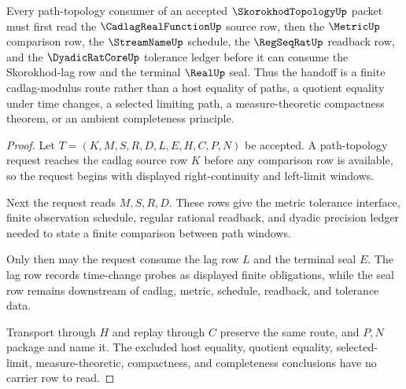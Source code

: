 \begin{theorem}
\label{thm:skorokhod-topology-cadlag-modulus-handoff}
Every path-topology consumer of an accepted $\SkorokhodTopologyUp$ packet must first read the $\CadlagRealFunctionUp$ source row, then the $\MetricUp$ comparison row, the $\StreamNameUp$ schedule, the $\RegSeqRatUp$ readback row, and the $\DyadicRatCoreUp$ tolerance ledger before it can consume the Skorokhod-lag row and the terminal $\RealUp$ seal. Thus the handoff is a finite cadlag-modulus route rather than a host equality of paths, a quotient equality under time changes, a selected limiting path, a measure-theoretic compactness theorem, or an ambient completeness principle.
\end{theorem}
\begin{proof}
Let $T=(K,M,S,R,D,L,E,H,C,P,N)$ be accepted. A path-topology request reaches the cadlag source row $K$ before any comparison row is available, so the request begins with displayed right-continuity and left-limit windows.

Next the request reads $M,S,R,D$. These rows give the metric tolerance interface, finite observation schedule, regular rational readback, and dyadic precision ledger needed to state a finite comparison between path windows.

Only then may the request consume the lag row $L$ and the terminal seal $E$. The lag row records time-change probes as displayed finite obligations, while the seal row remains downstream of cadlag, metric, schedule, readback, and tolerance data.

Transport through $H$ and replay through $C$ preserve the same route, and $P,N$ package and name it. The excluded host equality, quotient equality, selected-limit, measure-theoretic, compactness, and completeness conclusions have no carrier row to read.
\end{proof}


